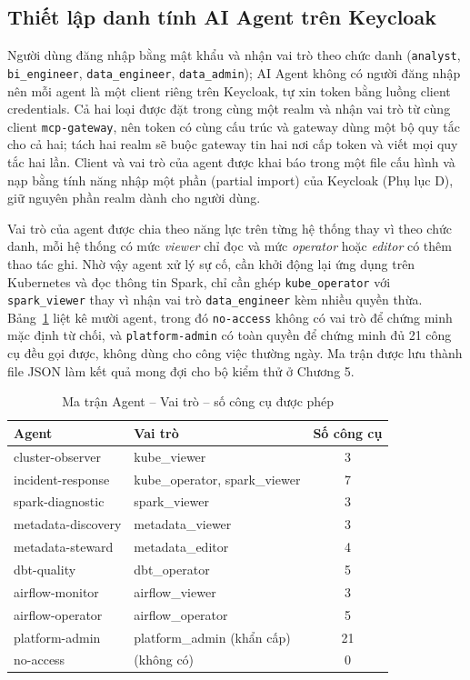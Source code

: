 \subsection{Thiết lập danh tính AI Agent trên Keycloak}\label{sec:agent}

Người dùng đăng nhập bằng mật khẩu và nhận vai trò theo chức danh (\texttt{analyst}, \texttt{bi\_engineer}, \texttt{data\_engineer}, \texttt{data\_admin}); AI Agent không có người đăng nhập nên mỗi agent là một client riêng trên Keycloak, tự xin token bằng luồng client credentials. Cả hai loại được đặt trong cùng một realm và nhận vai trò từ cùng client \texttt{mcp-gateway}, nên token có cùng cấu trúc và gateway dùng một bộ quy tắc cho cả hai; tách hai realm sẽ buộc gateway tin hai nơi cấp token và viết mọi quy tắc hai lần. Client và vai trò của agent được khai báo trong một file cấu hình và nạp bằng tính năng nhập một phần (partial import) của Keycloak (Phụ lục D), giữ nguyên phần realm dành cho người dùng.

Vai trò của agent được chia theo năng lực trên từng hệ thống thay vì theo chức danh, mỗi hệ thống có mức \textit{viewer} chỉ đọc và mức \textit{operator} hoặc \textit{editor} có thêm thao tác ghi. Nhờ vậy agent xử lý sự cố, cần khởi động lại ứng dụng trên Kubernetes và đọc thông tin Spark, chỉ cần ghép \texttt{kube\_operator} với \texttt{spark\_viewer} thay vì nhận vai trò \texttt{data\_engineer} kèm nhiều quyền thừa. Bảng~\ref{tab:agents} liệt kê mười agent, trong đó \texttt{no-access} không có vai trò để chứng minh mặc định từ chối, và \texttt{platform-admin} có toàn quyền để chứng minh đủ 21 công cụ đều gọi được, không dùng cho công việc thường ngày. Ma trận được lưu thành file JSON làm kết quả mong đợi cho bộ kiểm thử ở Chương 5.

\begin{table}[H]\centering\caption{Ma trận Agent -- Vai trò -- số công cụ được phép}\label{tab:agents}
{\singlespacing\renewcommand{\arraystretch}{1.15}\small
\begin{tabularx}{\textwidth}{|p{4.6cm}|X|c|}\hline
\textbf{Agent} & \textbf{Vai trò} & \textbf{Số công cụ} \\ \hline
cluster-observer & kube\_viewer & 3 \\ \hline
incident-response & kube\_operator, spark\_viewer & 7 \\ \hline
spark-diagnostic & spark\_viewer & 3 \\ \hline
metadata-discovery & metadata\_viewer & 3 \\ \hline
metadata-steward & metadata\_editor & 4 \\ \hline
dbt-quality & dbt\_operator & 5 \\ \hline
airflow-monitor & airflow\_viewer & 3 \\ \hline
airflow-operator & airflow\_operator & 5 \\ \hline
platform-admin & platform\_admin (khẩn cấp) & 21 \\ \hline
no-access & (không có) & 0 \\ \hline
\end{tabularx}}\end{table}

